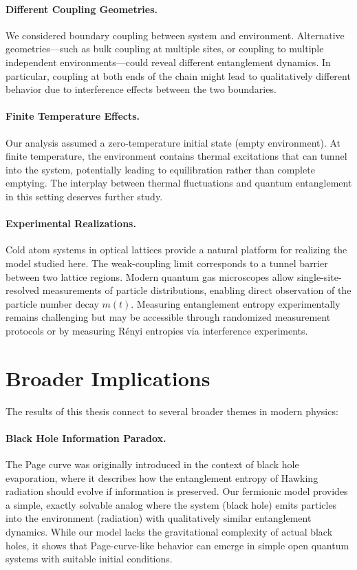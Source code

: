 \documentclass[12pt,oneside,openright]{report}
\theoremstyle{definition}
\theoremstyle{plain}
\theoremstyle{remark}
\begin{document}
\paragraph{Different Coupling Geometries.}
We considered boundary coupling between system and environment. Alternative geometries---such as bulk coupling at multiple sites, or coupling to multiple independent environments---could reveal different entanglement dynamics. In particular, coupling at both ends of the chain might lead to qualitatively different behavior due to interference effects between the two boundaries.

\paragraph{Finite Temperature Effects.}
Our analysis assumed a zero-temperature initial state (empty environment). At finite temperature, the environment contains thermal excitations that can tunnel into the system, potentially leading to equilibration rather than complete emptying. The interplay between thermal fluctuations and quantum entanglement in this setting deserves further study.

\paragraph{Experimental Realizations.}
Cold atom systems in optical lattices provide a natural platform for realizing the model studied here. The weak-coupling limit corresponds to a tunnel barrier between two lattice regions. Modern quantum gas microscopes allow single-site-resolved measurements of particle distributions, enabling direct observation of the particle number decay $m(t)$. Measuring entanglement entropy experimentally remains challenging but may be accessible through randomized measurement protocols or by measuring R\'enyi entropies via interference experiments.

\section{Broader Implications}
\label{sec:implications}

The results of this thesis connect to several broader themes in modern physics:

\paragraph{Black Hole Information Paradox.}
The Page curve was originally introduced in the context of black hole evaporation, where it describes how the entanglement entropy of Hawking radiation should evolve if information is preserved. Our fermionic model provides a simple, exactly solvable analog where the system (black hole) emits particles into the environment (radiation) with qualitatively similar entanglement dynamics. While our model lacks the gravitational complexity of actual black holes, it shows that Page-curve-like behavior can emerge in simple open quantum systems with suitable initial conditions.
\end{document}
